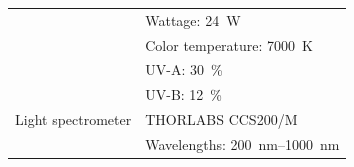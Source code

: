 \begin{table}[htbp]
\begin{tabularx}{\linewidth}{l|X}
        & \quad Wattage: \qty[mode=text]{24}{\W} \\
        & \quad Color temperature: \qty[mode=text]{7000}{\K} \\
        & \quad UV-A: \qty[mode=text]{30}{\percent} \\
        & \quad UV-B: \qty[mode=text]{12}{\percent} \\
        \bigstrut
        Light spectrometer\index{light spectrometer} & THORLABS CCS200/M\index{light spectrometer!THORLABS CCS200/M} \\
        & \quad Wavelengths: \qtyrange[mode=text, range-phrase=\textendash, range-units=single]{200}{1000}{\nm} \\
        \bottomrule
    \end{tabularx}
\end{table}

